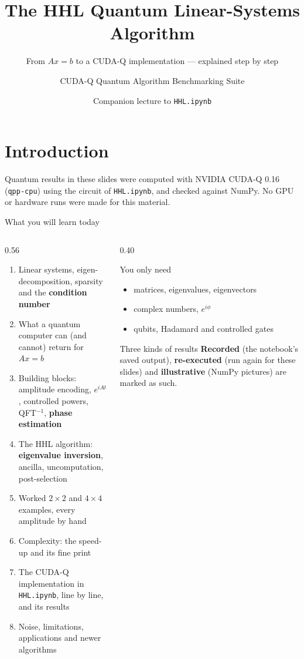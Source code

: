 \documentclass[aspectratio=169,11pt]{beamer}
\title{The HHL Quantum Linear-Systems Algorithm}
\subtitle{From $Ax = b$ to a CUDA-Q implementation --- explained step by step}
\author{CUDA-Q Quantum Algorithm Benchmarking Suite}
\date{Companion lecture to \texttt{HHL.ipynb}}
\newcommand{\key}[1]{{\color{qdark}\textbf{#1}}}
\begin{document}
\section{Introduction}
\begin{frame}
  \titlepage
  \centering\small\color{qgrey}
  Quantum results in these slides were computed with NVIDIA CUDA-Q 0.16 (\texttt{qpp-cpu}) using the circuit of
  \texttt{HHL.ipynb}, and checked against NumPy. No GPU or hardware runs were made for this material.
\end{frame}

\begin{frame}{What you will learn today}
  \begin{columns}[T]
    \begin{column}{0.56\textwidth}
      \footnotesize
      \begin{enumerate}\itemsep0pt
        \item Linear systems, eigen-decomposition, sparsity and the \key{condition number}
        \item What a quantum computer can (and cannot) return for $Ax = b$
        \item Building blocks: amplitude encoding, $e^{iAt}$, controlled powers, QFT$^{-1}$, \key{phase estimation}
        \item The HHL algorithm: \key{eigenvalue inversion}, ancilla, uncomputation, post-selection
        \item Worked $2\times2$ and $4\times4$ examples, every amplitude by hand
        \item Complexity: the speed-up and its fine print
        \item The CUDA-Q implementation in \texttt{HHL.ipynb}, line by line, and its results
        \item Noise, limitations, applications and newer algorithms
      \end{enumerate}
    \end{column}
    \begin{column}{0.40\textwidth}
      \begin{block}{You only need}
        \begin{itemize}
          \item matrices, eigenvalues, eigenvectors
          \item complex numbers, $e^{i\phi}$
          \item qubits, Hadamard and controlled gates
        \end{itemize}
      \end{block}
      \begin{alertblock}{Three kinds of results}
        \small \textbf{Recorded} (the notebook's saved output), \textbf{re-executed} (run again for these slides) and
        \textbf{illustrative} (NumPy pictures) are marked as such.
      \end{alertblock}
    \end{column}
  \end{columns}
\end{frame}
\end{document}

